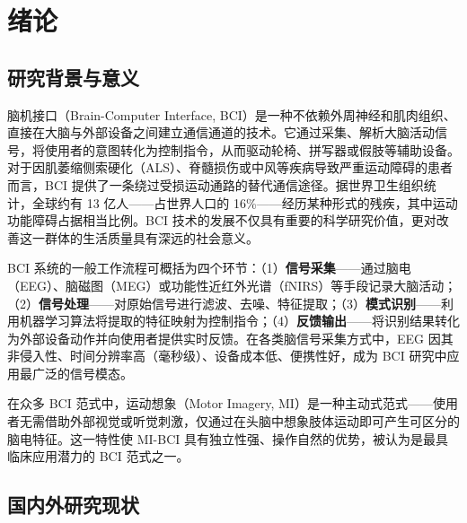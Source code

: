 
\section{绪论}
\label{sec:introduction}

\subsection{研究背景与意义}
\label{sec:background}

脑机接口（Brain-Computer Interface, BCI）是一种不依赖外周神经和肌肉组织、直接在大脑与外部设备之间建立通信通道的技术。它通过采集、解析大脑活动信号，将使用者的意图转化为控制指令，从而驱动轮椅、拼写器或假肢等辅助设备。对于因肌萎缩侧索硬化（ALS）、脊髓损伤或中风等疾病导致严重运动障碍的患者而言，BCI 提供了一条绕过受损运动通路的替代通信途径。据世界卫生组织统计，全球约有 13 亿人——占世界人口的 16\%——经历某种形式的残疾，其中运动功能障碍占据相当比例。BCI 技术的发展不仅具有重要的科学研究价值，更对改善这一群体的生活质量具有深远的社会意义。

BCI 系统的一般工作流程可概括为四个环节：（1）\textbf{信号采集}——通过脑电（EEG）、脑磁图（MEG）或功能性近红外光谱（fNIRS）等手段记录大脑活动；（2）\textbf{信号处理}——对原始信号进行滤波、去噪、特征提取；（3）\textbf{模式识别}——利用机器学习算法将提取的特征映射为控制指令；（4）\textbf{反馈输出}——将识别结果转化为外部设备动作并向使用者提供实时反馈。在各类脑信号采集方式中，EEG 因其非侵入性、时间分辨率高（毫秒级）、设备成本低、便携性好，成为 BCI 研究中应用最广泛的信号模态。

在众多 BCI 范式中，运动想象（Motor Imagery, MI）是一种主动式范式——使用者无需借助外部视觉或听觉刺激，仅通过在头脑中想象肢体运动即可产生可区分的脑电特征。这一特性使 MI-BCI 具有独立性强、操作自然的优势，被认为是最具临床应用潜力的 BCI 范式之一。

\subsection{国内外研究现状}
\label{sec:related-work}

